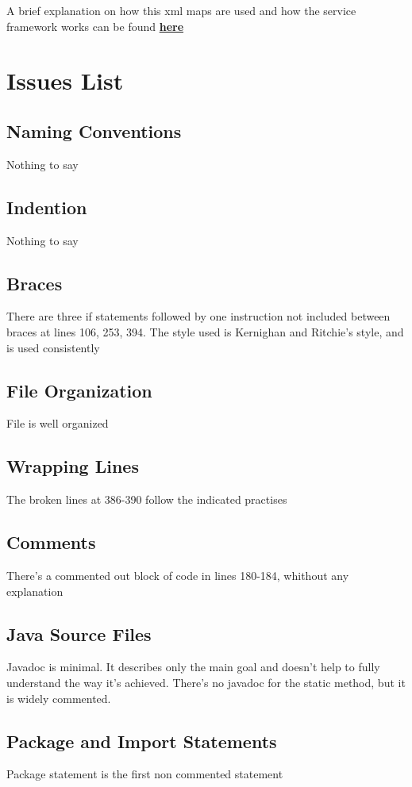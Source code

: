 \documentclass{article}
\begin{document}
A brief explanation on how this xml maps are used and how the service framework works can be found \href{https://cwiki.apache.org/confluence/display/OFBIZ/Service+Engine+Guide#ServiceEngineGuide-serviceDefinition}{\textbf{here}}



\section{Issues List}
\subsection{Naming Conventions}
Nothing to say
\subsection{Indention}
Nothing to say
\subsection{Braces}
There are three if statements followed by one instruction not included between braces at lines 106, 253, 394. The style used is Kernighan and Ritchie's style, and is used consistently
\subsection{File Organization}
File is well organized
\subsection{Wrapping Lines}
The broken lines at 386-390 follow the indicated practises
\subsection{Comments}
There's a commented out block of code in lines 180-184, whithout any explanation

\subsection{Java Source Files}
Javadoc is minimal. It describes only the main goal and doesn't help to fully understand the way it's achieved. There's no javadoc for the static method, but it is widely commented.

\subsection{Package and Import Statements}
Package statement is the first non commented statement
\end{document}
